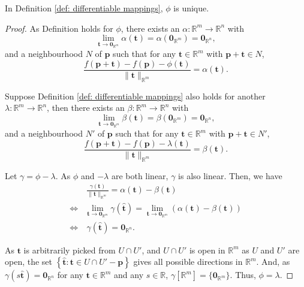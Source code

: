\begin{lemma}
	\label{lm: differentiable mappings: uniqueness of phi}
	In Definition \ref{def: differentiable mappings}, $\phi$ is unique.
	
	\begin{proof}
		As Definition holds for $\phi$, there exists an $\alpha: \mathbb R^{m} \to \mathbb R^n$ with
		$$
		\lim_{\mathbf t \to \mathbf 0_{\mathbb R^m}} \alpha(\mathbf t) = \alpha(\mathbf 0_{\mathbb R^m}) = \mathbf 0_{\mathbb R^n},
		$$
		and a neighbourhood $N$ of $\mathbf p$ such that for any $\mathbf t \in \mathbb R^m$ with $\mathbf p + \mathbf t \in N$,
		$$
		\frac{f(\mathbf p + \mathbf t) - f(\mathbf p) - \phi(\mathbf t)}{\|\mathbf t\|_{\mathbb R^m}} = \alpha(\mathbf t).
		$$
	
		Suppose Definition \ref{def: differentiable mappings} also holds for another $\lambda: \mathbb R^m \to \mathbb R^n$, then
		there exists an $\beta: \mathbb R^m \to \mathbb R^n$ with
		$$
		\lim_{\mathbf t \to \mathbf 0_{\mathbb R^m}} \beta(\mathbf t) = \beta(\mathbf 0_{\mathbb R^m}) = \mathbf 0_{\mathbb R^n},
		$$
		and a neighbourhood $N'$ of $\mathbf p$ such that for any $\mathbf t \in \mathbb R^m$ with $\mathbf p + \mathbf t \in N'$,
		$$
		\frac{f(\mathbf p + \mathbf t) - f(\mathbf p) - \lambda(\mathbf t)}{\|\mathbf t\|_{\mathbb R^m}} = \beta(\mathbf t).
		$$
		
		Let $\gamma = \phi - \lambda$. As $\phi$ and $-\lambda$ are both linear, $\gamma$ is also linear. Then, we have
		$$
		\begin{aligned}
		& \ \frac{\gamma(\mathbf t)}{\| \mathbf t \|_{\mathbb R^m}} = \alpha(\mathbf t) - \beta(\mathbf t) \\
		\iff & \lim_{\mathbf t \to \mathbf 0_{\mathbb R^m}} \gamma(\mathbf{\hat t}) = \lim_{\mathbf t \to \mathbf 0_{\mathbb R^m}} (\alpha(\mathbf t) - \beta(\mathbf t)) \\
		\iff& \ \gamma(\mathbf{\hat t}) = \mathbf 0_{\mathbb R^n}.
		\end{aligned}		
		$$
		
		As $\mathbf t$ is arbitrarily picked from $U \cap U'$, and $U \cap U'$ is open in $\mathbb R^m$ as $U$ and $U'$ are open, the set $\left\{ \mathbf{\hat t} : \mathbf t \in U \cap U' - \mathbf p \right\}$ gives all possible directions in $\mathbb R^m$. And, as $\gamma(s \mathbf{\hat t}) = \mathbf 0_{\mathbb R^n}$ for any $\mathbf t \in \mathbb R^m$ and any $s \in \mathbb R$, $\gamma[\mathbb R^m] = \{\mathbf 0_{\mathbb R^m}\}$. Thus, $\phi = \lambda$.
	\end{proof}
\end{lemma}


